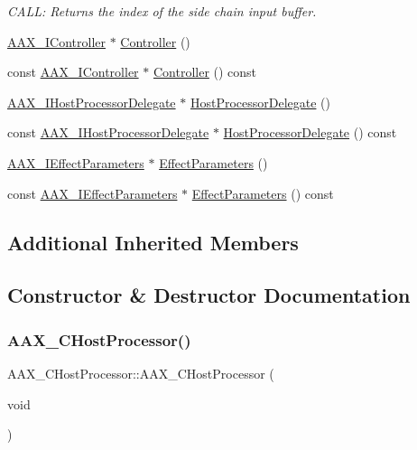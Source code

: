 \begin{DoxyCompactItemize}
\begin{DoxyCompactList}\small\item\em C\+A\+LL\+: Returns the index of the side chain input buffer. \end{DoxyCompactList}\item 
\mbox{\hyperlink{a01789}{A\+A\+X\+\_\+\+I\+Controller}} $\ast$ \mbox{\hyperlink{a01485_ab63ce71f04ca92bbd18608be32d58b38}{Controller}} ()
\item 
const \mbox{\hyperlink{a01789}{A\+A\+X\+\_\+\+I\+Controller}} $\ast$ \mbox{\hyperlink{a01485_a1a131723ba34e89d0a2c190c2e1879cc}{Controller}} () const
\item 
\mbox{\hyperlink{a01837}{A\+A\+X\+\_\+\+I\+Host\+Processor\+Delegate}} $\ast$ \mbox{\hyperlink{a01485_a8cea2a8e266babcf5b6812669b7a40db}{Host\+Processor\+Delegate}} ()
\item 
const \mbox{\hyperlink{a01837}{A\+A\+X\+\_\+\+I\+Host\+Processor\+Delegate}} $\ast$ \mbox{\hyperlink{a01485_aa2f5250cb4c41c18268d44cdb51d9fee}{Host\+Processor\+Delegate}} () const
\item 
\mbox{\hyperlink{a01825}{A\+A\+X\+\_\+\+I\+Effect\+Parameters}} $\ast$ \mbox{\hyperlink{a01485_aa4814b762825385280f69ed71949ac48}{Effect\+Parameters}} ()
\item 
const \mbox{\hyperlink{a01825}{A\+A\+X\+\_\+\+I\+Effect\+Parameters}} $\ast$ \mbox{\hyperlink{a01485_a68e172bc2baa53974708fc95404c0fce}{Effect\+Parameters}} () const
\end{DoxyCompactItemize}
\subsection*{Additional Inherited Members}


\subsection{Constructor \& Destructor Documentation}
\mbox{\label{a01485_ab9c80cadc9eee6d44713eac97d0a4e09}} 
\subsubsection{\texorpdfstring{AAX\_CHostProcessor()}{AAX\_CHostProcessor()}}
{\footnotesize\ttfamily A\+A\+X\+\_\+\+C\+Host\+Processor\+::\+A\+A\+X\+\_\+\+C\+Host\+Processor (\begin{DoxyParamCaption}\item[{void}]{ }\end{DoxyParamCaption})}

